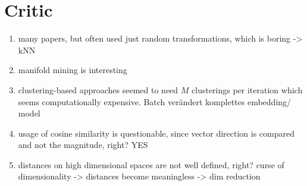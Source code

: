\section{Critic}\label{sec:critic}


\begin{enumerate}
    \item many papers, but often used just random transformations, which is boring -> kNN
    \item manifold mining is interesting
    \item clustering-based approaches seemed to need $M$ clusterings per iteration 
    which seems computationally expensive. Batch verändert komplettes embedding/ model
    \item usage of cosine similarity is questionable, since vector direction is compared and 
    not the magnitude, right? YES
    \item distances on high dimensional spaces are not well defined, right? curse of dimensionality -> distances become meaningless -> dim reduction
\end{enumerate}

